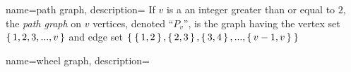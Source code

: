 {
  name={path graph},
  description={%
    If $v$ is a an integer greater than or equal to $2$, the \textsl{path graph}
    on $v$ vertices, denoted ``$P_{v}$'', is the graph having the vertex set
    $\set{1,2,3,...,v}$ and edge set
    $\Set{\set{1,2},\set{2,3},\set{3,4},...,\set{v-1,v}}$%
  }
}

{
  name={wheel graph},
  description={}
}
